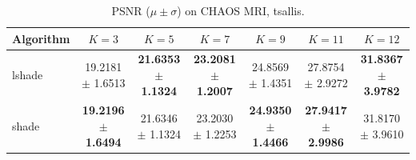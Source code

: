 \begin{table}[htbp]
\centering
\caption{PSNR ($\mu \pm \sigma$) on CHAOS MRI, tsallis.}
\label{tab:exp2-tsallis-psnr}
\begin{tabular}{lcccccc}
\toprule
Algorithm & $K=3$ & $K=5$ & $K=7$ & $K=9$ & $K=11$ & $K=12$ \\
\midrule
lshade & 19.2181 $\pm$ 1.6513 & \textbf{21.6353 $\pm$ 1.1324} & \textbf{23.2081 $\pm$ 1.2007} & 24.8569 $\pm$ 1.4351 & 27.8754 $\pm$ 2.9272 & \textbf{31.8367 $\pm$ 3.9782} \\
shade & \textbf{19.2196 $\pm$ 1.6494} & 21.6346 $\pm$ 1.1324 & 23.2030 $\pm$ 1.2253 & \textbf{24.9350 $\pm$ 1.4466} & \textbf{27.9417 $\pm$ 2.9986} & 31.8170 $\pm$ 3.9610 \\
\bottomrule
\end{tabular}
\end{table}